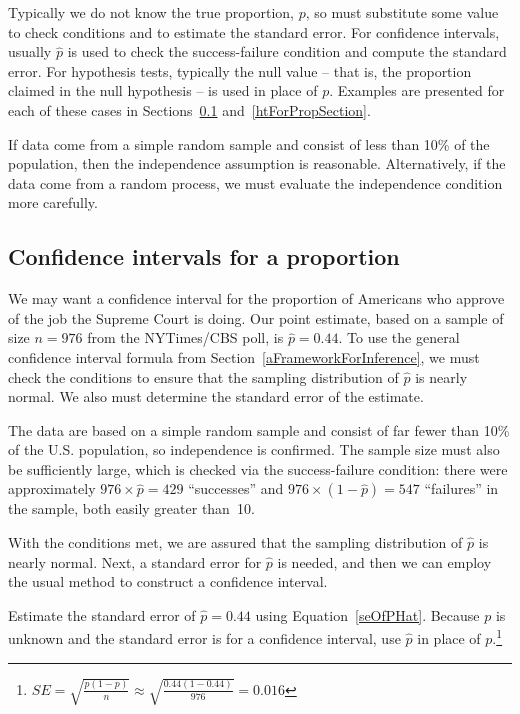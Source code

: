 Typically we do not know the true proportion, $p$, so must substitute some value to check conditions and to estimate the standard error. For confidence intervals, usually $\hat{p}$ is used to check the success-failure condition and compute the standard error. For hypothesis tests, typically the null value -- that is, the proportion claimed in the null hypothesis -- is used in place of $p$. Examples are presented for each of these cases in Sections~\ref{confIntForPropSection} and~\ref{htForPropSection}.

\begin{tipBox}{
If data come from a simple random sample and consist of less than 10\% of the population, then the independence assumption is reasonable. Alternatively, if the data come from a random process, we must evaluate the independence condition more carefully.}
\end{tipBox}


\subsection{Confidence intervals for a proportion}
\label{confIntForPropSection}


We may want a confidence interval for the proportion of Americans who approve of the job the Supreme Court is doing. Our point estimate, based on a sample of size $n = 976$ from the NYTimes/CBS poll, is $\hat{p} = 0.44$. To use the general confidence interval formula from Section~\ref{aFrameworkForInference}, we must check the conditions to ensure that the sampling distribution of $\hat{p}$ is nearly normal. We also must determine the standard error of the estimate.

The data are based on a simple random sample and consist of far fewer than 10\% of the U.S. population, so independence is confirmed. The sample size must also be sufficiently large, which is checked via the success-failure condition: there were approximately $976\times \hat{p}=429$ ``successes'' and $976\times (1-\hat{p})=547$ ``failures'' in the sample, both easily greater than~10.

With the conditions met, we are assured that the sampling distribution of $\hat{p}$ is nearly normal. Next, a standard error for $\hat{p}$ is needed, and then we can employ the usual method to construct a confidence interval.

\begin{exercise} \label{seOfPropOfAmericansJobApprovalOfSupremeCourt}
Estimate the standard error of $\hat{p}=0.44$ using Equation~\eqref{seOfPHat}. Because $p$ is unknown and the standard error is for a confidence interval, use $\hat{p}$ in place of $p$.\footnote{$SE = \sqrt{\frac{p(1-p)}{n}} \approx \sqrt{\frac{0.44(1-0.44)}{976}} = 0.016$}
\end{exercise}

